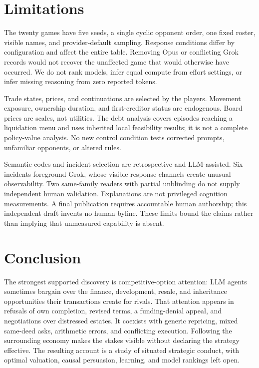 \section{Limitations}

The twenty games have five seeds, a single cyclic opponent order, one fixed roster, visible names, and provider-default sampling. Response conditions differ by configuration and affect the entire table. Removing Opus or conflicting Grok records would not recover the unaffected game that would otherwise have occurred. We do not rank models, infer equal compute from effort settings, or infer missing reasoning from zero reported tokens.

Trade states, prices, and continuations are selected by the players. Movement exposure, ownership duration, and first-creditor status are endogenous. Board prices are scales, not utilities. The debt analysis covers episodes reaching a liquidation menu and uses inherited local feasibility results; it is not a complete policy-value analysis. No new control condition tests corrected prompts, unfamiliar opponents, or altered rules.

Semantic codes and incident selection are retrospective and LLM-assisted. Six incidents foreground Grok, whose visible response channels create unusual observability. Two same-family readers with partial unblinding do not supply independent human validation. Explanations are not privileged cognition measurements. A final publication requires accountable human authorship; this independent draft invents no human byline. These limits bound the claims rather than implying that unmeasured capability is absent.

\section{Conclusion}

The strongest supported discovery is competitive-option attention: LLM agents sometimes bargain over the finance, development, resale, and inheritance opportunities their transactions create for rivals. That attention appears in refusals of own completion, revised terms, a funding-denial appeal, and negotiations over distressed estates. It coexists with generic repricing, mixed same-deed asks, arithmetic errors, and conflicting execution. Following the surrounding economy makes the stakes visible without declaring the strategy effective. The resulting account is a study of situated strategic conduct, with optimal valuation, causal persuasion, learning, and model rankings left open.
